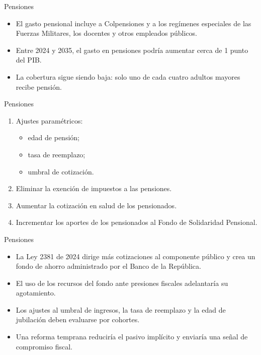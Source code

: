 \begin{frame}{Pensiones}
\begin{itemize}
    \item El gasto pensional incluye a Colpensiones y a los regímenes especiales de las Fuerzas Militares, los docentes y otros empleados públicos.
    \item Entre 2024 y 2035, el gasto en pensiones podría aumentar cerca de 1 punto del PIB.
    \item La cobertura sigue siendo baja: solo uno de cada cuatro adultos mayores recibe pensión.
\end{itemize}
\end{frame}

\begin{frame}{Pensiones}
\begin{enumerate}
    \item Ajustes paramétricos:
    \begin{itemize}
        \item edad de pensión;
        \item tasa de reemplazo;
        \item umbral de cotización.
    \end{itemize}
    \item Eliminar la exención de impuestos a las pensiones.
    \item Aumentar la cotización en salud de los pensionados.
    \item Incrementar los aportes de los pensionados al Fondo de Solidaridad Pensional.
\end{enumerate}
\end{frame}

\begin{frame}{Pensiones}
\begin{itemize}
    \item La Ley 2381 de 2024 dirige más cotizaciones al componente público y crea un fondo de ahorro administrado por el Banco de la República.
    \item El uso de los recursos del fondo ante presiones fiscales adelantaría su agotamiento.
    \item Los ajustes al umbral de ingresos, la tasa de reemplazo y la edad de jubilación deben evaluarse por cohortes.
    \item Una reforma temprana reduciría el pasivo implícito y enviaría una señal de compromiso fiscal.
\end{itemize}
\end{frame}